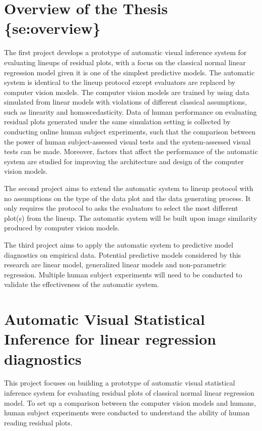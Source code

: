\documentclass{monashthesis}
\theoremstyle{definition}
\theoremstyle{definition}
\theoremstyle{definition}
\theoremstyle{definition}
\theoremstyle{remark}
\begin{document}
\hypertarget{overview-of-the-thesis-seoverview}{%
\chapter{Overview of the Thesis \{se:overview\}}\label{overview-of-the-thesis-seoverview}}

The first project develops a prototype of automatic visual inference system for evaluating lineups of residual plots, with a focus on the classical normal linear regression model given it is one of the simplest predictive models. The automatic system is identical to the lineup protocol except evaluators are replaced by computer vision models. The computer vision models are trained by using data simulated from linear models with violations of different classical assumptions, such as linearity and homoscedasticity. Data of human performance on evaluating residual plots generated under the same simulation setting is collected by conducting online human subject experiments, such that the comparison between the power of human subject-assessed visual tests and the system-assessed visual tests can be made. Moreover, factors that affect the performance of the automatic system are studied for improving the architecture and design of the computer vision models.

The second project aims to extend the automatic system to lineup protocol with no assumptions on the type of the data plot and the data generating process. It only requires the protocol to asks the evaluators to select the most different plot(s) from the lineup. The automatic system will be built upon image similarity produced by computer vision models.

The third project aims to apply the automatic system to predictive model diagnostics on empirical data. Potential predictive models considered by this research are linear model, generalized linear models and non-parametric regression. Multiple human subject experiments will need to be conducted to validate the effectiveness of the automatic system.

\hypertarget{se:project-1}{%
\chapter{Automatic Visual Statistical Inference for linear regression diagnostics}\label{se:project-1}}

This project focuses on building a prototype of automatic visual statistical inference system for evaluating residual plots of classical normal linear regression model. To set up a comparison between the computer vision models and humans, human subject experiments were conducted to understand the ability of human reading residual plots.
\end{document}
